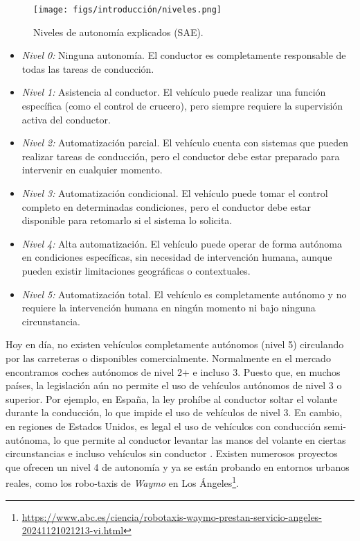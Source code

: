 \newpage

\begin{figure} [ht]
\begin{center}
\texttt{[image: figs/introducción/niveles.png]}
\end{center}
\caption{Niveles de autonomía explicados (\ac{SAE}).}
\label{fig:aut-levels}
\end{figure}

\begin{itemize}
\item \textit{Nivel 0:} Ninguna autonomía. El conductor es completamente responsable de todas las tareas de conducción.
\item \textit{Nivel 1:} Asistencia al conductor. El vehículo puede realizar una función específica (como el control de crucero), pero siempre requiere la supervisión activa del conductor.
\item \textit{Nivel 2:} Automatización parcial. El vehículo cuenta con sistemas que pueden realizar tareas de conducción, pero el conductor debe estar preparado para intervenir en cualquier momento.
\item \textit{Nivel 3:} Automatización condicional. El vehículo puede tomar el control completo en determinadas condiciones, pero el conductor debe estar disponible para retomarlo si el sistema lo solicita.
\item \textit{Nivel 4:} Alta automatización. El vehículo puede operar de forma autónoma en condiciones específicas, sin necesidad de intervención humana, aunque pueden existir limitaciones geográficas o contextuales.
\item \textit{Nivel 5:} Automatización total. El vehículo es completamente autónomo y no requiere la intervención humana en ningún momento ni bajo ninguna circunstancia.
\end{itemize}

Hoy en día, no existen vehículos completamente autónomos (nivel 5) circulando por las carreteras o disponibles comercialmente. Normalmente en el mercado encontramos coches autónomos de nivel 2+ e incluso 3. Puesto que, en muchos países, la legislación aún no permite el uso de vehículos autónomos de nivel 3 o superior. Por ejemplo, en España, la ley prohíbe al conductor soltar el volante durante la conducción, lo que impide el uso de vehículos de nivel 3. En cambio, en regiones de Estados Unidos, es legal el uso de vehículos con conducción semi-autónoma, lo que permite al conductor levantar las manos del volante en ciertas circunstancias e incluso vehículos sin conductor \cite{carwow-autonomous}. Existen numerosos proyectos que ofrecen un nivel 4 de autonomía y ya se están probando en entornos urbanos reales, como los robo-taxis de \textit{Waymo} en Los Ángeles\footnote{\url{https://www.abc.es/ciencia/robotaxis-waymo-prestan-servicio-angeles-20241121021213-vi.html}}.

